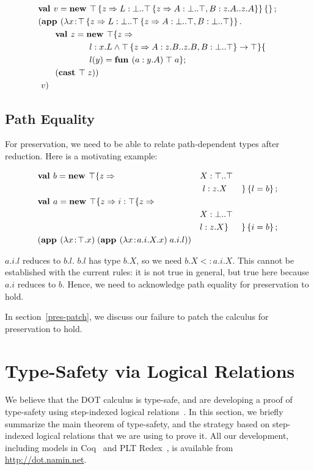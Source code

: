 \documentclass[9pt]{sigplanconf}
\begin{document}
\begin{align*}
&\textbf{val }v = \textbf{new }\top \left\{z \Rightarrow L : \bot..\top \left\{z \Rightarrow A : \bot..\top, B : z.A..z.A \right\} \right\} \left\{\right\} ;\;\\&
(\textbf{app }(\lambda x\!:\!\top \left\{z \Rightarrow L : \bot..\top \left\{z \Rightarrow A : \bot..\top, B : \bot..\top \right\} \right\}.\\&\quad\quad
\textbf{val }z = \textbf{new }\top \{z \Rightarrow \\&\quad\quad\quad\quad\quad\quad
l : x.L \wedge {\top\left\{z \Rightarrow A : z.B..z.B, B : \bot..\top\right\}} \rightarrow \top \}\{\\&\quad\quad\quad\quad\quad\quad
l(y) = \textbf{fun } (a:y.A)\;\top\;a\} ;\;\\&
\quad\quad (\textbf{cast }\top\;z)
)\;\\&\ v)
\end{align*}

\subsection{Path Equality}\label{patheq}

For preservation, we need to be able to relate path-dependent types
after reduction. Here is a motivating example:

\begin{align*}
&\textbf{val }b = \textbf{new }\top \{z \Rightarrow &&X : \top..\top&\\
&&&\ l : z.X& \}\left\{l = b\right\} ;\;\\&
\textbf{val }a = \textbf{new }\top \{z \Rightarrow i : \top \{z \Rightarrow &&&\\
&&&X : \bot..\top\\
&&&l : z.X \}& \}\left\{i = b\right\} ;\;\\&
(\textbf{app }(\lambda x\!:\!\top.x)\;(\textbf{app }(\lambda x\!:\!a.i.X.x)\;a.i.l))
\end{align*}

$a.i.l$ reduces to $b.l$. $b.l$ has type $b.X$, so we need $b.X <:
a.i.X$. This cannot be established with the current rules: it is not
true in general, but true here because $a.i$ reduces to $b$. Hence,
we need to acknowledge path equality for preservation to hold.

In section~\ref{pres-patch}, we discuss our failure to patch the
calculus for preservation to hold.

\section{Type-Safety via Logical Relations}\label{dot-type-safety}

We believe that the DOT calculus is type-safe, and are developing a
proof of type-safety using step-indexed logical
relations~\cite{ahmed04,ahmed06,step_indexed_obj}. In this section, we
briefly summarize the main theorem of type-safety, and the strategy
based on step-indexed logical relations that we are using to prove
it. All our development, including models in Coq~\cite{coq} and PLT Redex~\cite{plt_redex}, is
available from \url{http://dot.namin.net}.
\end{document}
